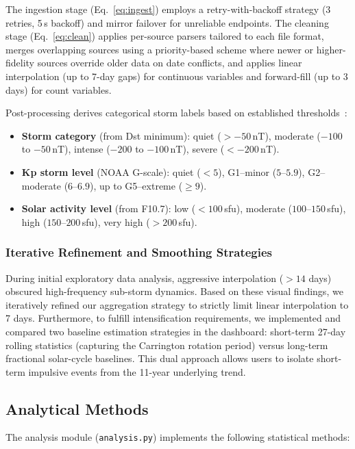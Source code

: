 The ingestion stage (Eq.~\ref{eq:ingest}) employs a retry-with-backoff strategy (3 retries, 5\,s backoff) and mirror failover for unreliable endpoints. The cleaning stage (Eq.~\ref{eq:clean}) applies per-source parsers tailored to each file format, merges overlapping sources using a priority-based scheme where newer or higher-fidelity sources override older data on date conflicts, and applies linear interpolation (up to 7-day gaps) for continuous variables and forward-fill (up to 3 days) for count variables.

Post-processing derives categorical storm labels based on established thresholds~\citep{gonzalez_storms_1994}:
\begin{itemize}
    \item \textbf{Storm category} (from Dst minimum): quiet ($> -50$\,nT), moderate ($-100$ to $-50$\,nT), intense ($-200$ to $-100$\,nT), severe ($< -200$\,nT).
    \item \textbf{Kp storm level} (NOAA G-scale): quiet ($< 5$), G1--minor ($5$--$5.9$), G2--moderate ($6$--$6.9$), up to G5--extreme ($\geq 9$).
    \item \textbf{Solar activity level} (from F10.7): low ($< 100$\,sfu), moderate ($100$--$150$\,sfu), high ($150$--$200$\,sfu), very high ($> 200$\,sfu).
\end{itemize}

\subsubsection*{Iterative Refinement and Smoothing Strategies}
During initial exploratory data analysis, aggressive interpolation ($>14$ days) obscured high-frequency sub-storm dynamics. Based on these visual findings, we iteratively refined our aggregation strategy to strictly limit linear interpolation to 7 days. Furthermore, to fulfill intensification requirements, we implemented and compared two baseline estimation strategies in the dashboard: short-term 27-day rolling statistics (capturing the Carrington rotation period) versus long-term fractional solar-cycle baselines. This dual approach allows users to isolate short-term impulsive events from the 11-year underlying trend.


\subsection{Analytical Methods}

The analysis module (\texttt{analysis.py}) implements the following statistical methods:


